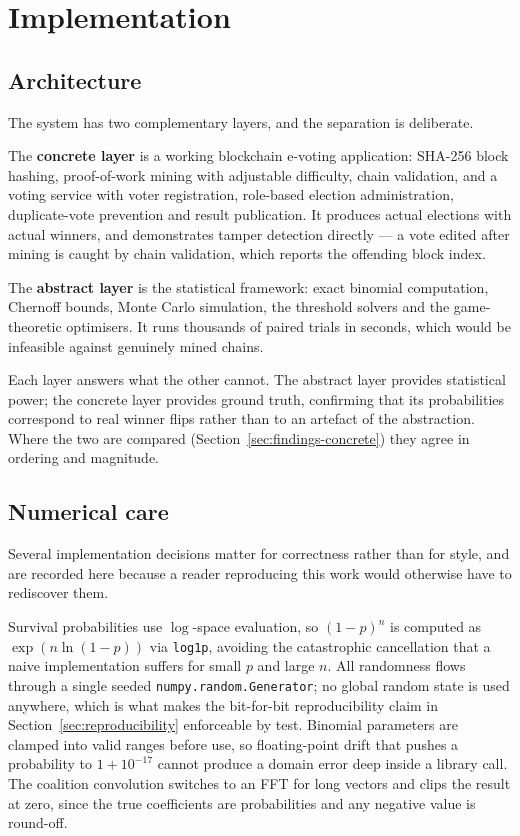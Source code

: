 \documentclass[11pt,a4paper]{article}
\newcommand{\code}[1]{\texttt{\small #1}}
\begin{document}
\section{Implementation}

\subsection{Architecture}

The system has two complementary layers, and the separation is deliberate.

The \textbf{concrete layer} is a working blockchain e-voting application: SHA-256 block
hashing, proof-of-work mining with adjustable difficulty, chain validation, and a voting
service with voter registration, role-based election administration, duplicate-vote
prevention and result publication. It produces actual elections with actual winners, and
demonstrates tamper detection directly --- a vote edited after mining is caught by chain
validation, which reports the offending block index.

The \textbf{abstract layer} is the statistical framework: exact binomial computation,
Chernoff bounds, Monte Carlo simulation, the threshold solvers and the game-theoretic
optimisers. It runs thousands of paired trials in seconds, which would be infeasible
against genuinely mined chains.

Each layer answers what the other cannot. The abstract layer provides statistical power;
the concrete layer provides ground truth, confirming that its probabilities correspond
to real winner flips rather than to an artefact of the abstraction. Where the two are
compared (Section~\ref{sec:findings-concrete}) they agree in ordering and magnitude.

\subsection{Numerical care}

Several implementation decisions matter for correctness rather than for style, and are
recorded here because a reader reproducing this work would otherwise have to rediscover
them.

Survival probabilities use $\log$-space evaluation, so $(1-p)^n$ is computed as
$\exp(n \ln(1-p))$ via \code{log1p}, avoiding the catastrophic cancellation that a naive
implementation suffers for small $p$ and large $n$. All randomness flows through a
single seeded \code{numpy.random.Generator}; no global random state is used anywhere,
which is what makes the bit-for-bit reproducibility claim in
Section~\ref{sec:reproducibility} enforceable by test. Binomial parameters are clamped
into valid ranges before use, so floating-point drift that pushes a probability to
$1 + 10^{-17}$ cannot produce a domain error deep inside a library call. The coalition
convolution switches to an FFT for long vectors and clips the result at zero, since the
true coefficients are probabilities and any negative value is round-off.
\end{document}
